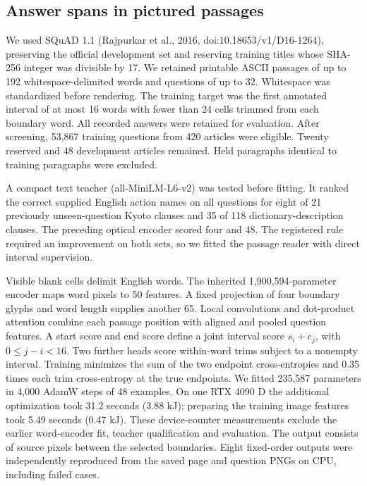 \subsection*{Answer spans in pictured passages}
We used SQuAD 1.1 (Rajpurkar et al., 2016, doi:10.18653/v1/D16-1264), preserving the official development set and reserving training titles whose SHA-256 integer was divisible by 17. We retained printable ASCII passages of up to 192 whitespace-delimited words and questions of up to 32. Whitespace was standardized before rendering. The training target was the first annotated interval of at most 16 words with fewer than 24 cells trimmed from each boundary word. All recorded answers were retained for evaluation. After screening, 53,867 training questions from 420 articles were eligible. Twenty reserved and 48 development articles remained. Held paragraphs identical to training paragraphs were excluded.

A compact text teacher (all-MiniLM-L6-v2) was tested before fitting. It ranked the correct supplied English action names on all questions for eight of 21 previously unseen-question Kyoto clauses and 35 of 118 dictionary-description clauses. The preceding optical encoder scored four and 48. The registered rule required an improvement on both sets, so we fitted the passage reader with direct interval supervision.

Visible blank cells delimit English words. The inherited 1,900,594-parameter encoder maps word pixels to 50 features. A fixed projection of four boundary glyphs and word length supplies another 65. Local convolutions and dot-product attention combine each passage position with aligned and pooled question features. A start score and end score define a joint interval score $s_i+e_j$, with $0\leq j-i<16$. Two further heads score within-word trims subject to a nonempty interval. Training minimizes the sum of the two endpoint cross-entropies and 0.35 times each trim cross-entropy at the true endpoints. We fitted 235,587 parameters in 4,000 AdamW steps of 48 examples. On one RTX 4090 D the additional optimization took 31.2 seconds (3.88 kJ); preparing the training image features took 5.49 seconds (0.47 kJ). These device-counter measurements exclude the earlier word-encoder fit, teacher qualification and evaluation. The output consists of source pixels between the selected boundaries. Eight fixed-order outputs were independently reproduced from the saved page and question PNGs on CPU, including failed cases.
